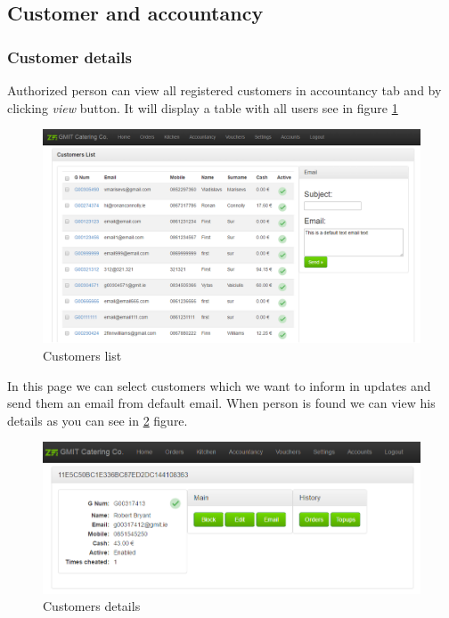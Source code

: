 	\subsection{Customer and accountancy}
		\subsubsection{Customer details}
		
		Authorized person can view all registered customers in accountancy tab and by clicking \textit{view} button. It will display a table with all users see in figure \ref{fig:customer-list}
		
		\begin{figure}[H]
			\centering
			\includegraphics[width=1\textwidth]{img/zf2/04-customers.png}
			\caption{Customers list}
			\label{fig:customer-list}
		\end{figure}
		
		In this page we can select customers which we want to inform in updates and send them an email from default email. 
		When person is found we can view his details as you can see in \ref{fig:customer-details} figure.
		
		\begin{figure}[H]
			\centering
			\includegraphics[width=1\textwidth]{img/zf2/02-customer_information.png}
			\caption{Customers details}
			\label{fig:customer-details}
		\end{figure}
		
